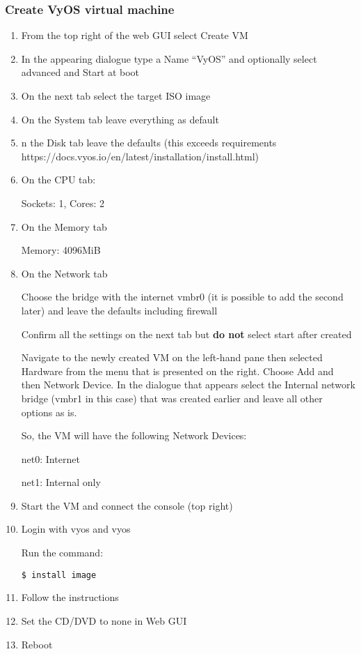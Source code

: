 \hypertarget{create-vyos-virtual-machine}{%
\subsubsection{Create VyOS virtual
machine}\label{create-vyos-virtual-machine}}

\begin{enumerate}
\def\labelenumi{\arabic{enumi}.}
\item
  From the top right of the web GUI select Create VM
\item
  In the appearing dialogue type a Name ``VyOS'' and optionally select
  advanced and Start at boot
\item
  On the next tab select the target ISO image
\item
  On the System tab leave everything as default
\item
  n the Disk tab leave the defaults (this exceeds requirements
  https://docs.vyos.io/en/latest/installation/install.html)
\item
  On the CPU tab:

  Sockets: 1, Cores: 2
\item
  On the Memory tab

  Memory: 4096MiB
\item
  On the Network tab

  Choose the bridge with the internet vmbr0 (it is possible to add the
  second later) and leave the defaults including firewall

  Confirm all the settings on the next tab but \textbf{do not} select
  start after created

  Navigate to the newly created VM on the left-hand pane then selected
  Hardware from the menu that is presented on the right. Choose Add and
  then Network Device. In the dialogue that appears select the Internal
  network bridge (vmbr1 in this case) that was created earlier and leave
  all other options as is.

  So, the VM will have the following Network Devices:

  net0: Internet

  net1: Internal only
\item
  Start the VM and connect the console (top right)
\item
  Login with vyos and vyos

  Run the command:

\begin{verbatim}
$ install image
\end{verbatim}
\item
  Follow the instructions
\item
  Set the CD/DVD to none in Web GUI
\item
  Reboot
\end{enumerate}

